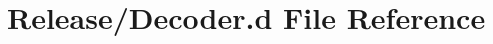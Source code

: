 \hypertarget{Release_2Decoder_8d}{}\section{Release/\+Decoder.d File Reference}
\label{Release_2Decoder_8d}
